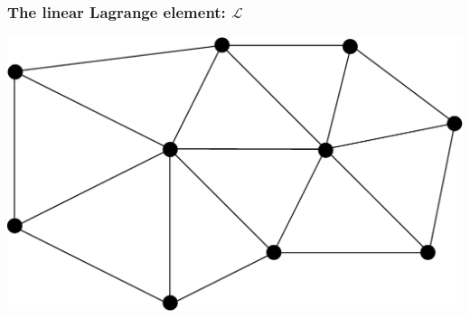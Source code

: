 \begin{frame}
  \frametitle{The linear Lagrange element: $\mathcal{L}$}

  \begin{center}
    \includegraphics[width=\textwidth]{pdf/mesh-p1.pdf}
  \end{center}

\end{frame}
